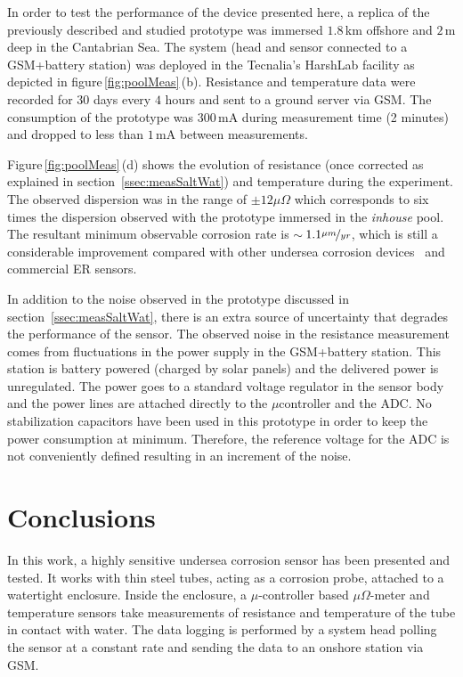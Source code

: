\documentclass[journal,twoside,web]{ieeecolor}
\begin{document}
In order to test the performance of the device presented here, a replica of the previously described and studied prototype was immersed $1.8$\,km offshore and $2$\,m deep in the Cantabrian Sea. The system (head and sensor connected to a GSM+battery station) was deployed in the Tecnalia's HarshLab facility as depicted in figure\,\ref{fig:poolMeas}\,(b). Resistance and temperature data were recorded for $30$ days every $4$ hours and sent to a ground server via GSM. The consumption of the prototype was $300$\,mA during measurement time (2 minutes) and dropped to less than $1$\,mA between measurements.

Figure\,\ref{fig:poolMeas}\,(d) shows the evolution of resistance (once corrected as explained in section~\ref{ssec:measSaltWat}) and temperature during the experiment. The observed dispersion was in the range of $\pm12\mu\Omega$ which corresponds to six times the dispersion observed with the prototype immersed in the \textit{inhouse} pool. The resultant minimum observable corrosion rate is $\sim$\,$1.1\nicefrac{\mu m}{yr}$, which is still a considerable improvement compared with other undersea corrosion devices~\cite{Yang2008} and commercial ER sensors. 

In addition to the noise observed in the prototype discussed in section~\ref{ssec:measSaltWat}, there is an extra source of uncertainty that degrades the performance of the sensor. The observed noise in the resistance measurement comes from fluctuations in the power supply in the GSM+battery station. This station is battery powered (charged by solar panels) and the delivered power is unregulated. The power goes to a standard voltage regulator in the sensor body and the power lines are attached directly to the $\mu$controller and the ADC. No stabilization capacitors have been used in this prototype in order to keep the power consumption at minimum. Therefore, the reference voltage for the ADC is not conveniently defined resulting in an increment of the noise.

\section{Conclusions}
\label{sec:conclusions}
In this work, a highly sensitive undersea corrosion sensor has been presented and tested. It works with thin steel tubes, acting as a corrosion probe, attached to a watertight enclosure. Inside the enclosure, a $\mu$-controller based $\mu\Omega$-meter and temperature sensors take measurements of resistance and temperature of the tube in contact with water. The data logging is performed by a system head polling the sensor at a constant rate and sending the data to an onshore station via GSM. 
\end{document}
